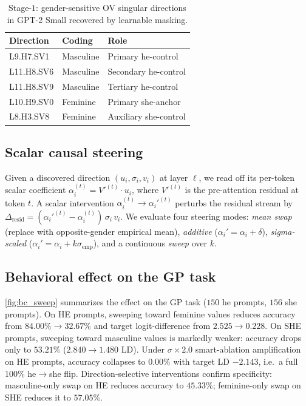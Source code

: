 \begin{table}[t]
\centering
\small
\caption{Stage-$1$: gender-sensitive OV singular directions in
GPT-2 Small recovered by learnable masking.}
\label{tab:directions}
\begin{tabular}{lll}
\toprule
Direction   & Coding    & Role             \\
\midrule
L9.H7.SV1   & Masculine & Primary he-control \\
L11.H8.SV6  & Masculine & Secondary he-control \\
L11.H8.SV9  & Masculine & Tertiary he-control \\
L10.H9.SV0  & Feminine  & Primary she-anchor \\
L8.H3.SV8   & Feminine  & Auxiliary she-control \\
\bottomrule
\end{tabular}
\end{table}

\subsection{Scalar causal steering}
\label{sec:bc_steering}

Given a discovered direction $(u_i, \sigma_i, v_i)$ at layer
$\ell$, we read off its per-token scalar coefficient
$\alpha_i^{(t)} = V'^{(t)} \cdot u_i$, where $V'^{(t)}$ is the
pre-attention residual at token $t$. A scalar intervention
$\alpha_i^{(t)} \to \alpha_i'^{(t)}$ perturbs the residual stream
by $\Delta_{\text{resid}} =
  (\alpha_i'^{(t)} - \alpha_i^{(t)})\,\sigma_i\,v_i$.
We evaluate four steering modes: \emph{mean swap} (replace with
opposite-gender empirical mean), \emph{additive}
($\alpha_i' = \alpha_i + \delta$), \emph{sigma-scaled}
($\alpha_i' = \alpha_i + k\sigma_{\text{emp}}$), and a continuous
\emph{sweep} over $k$.

\subsection{Behavioral effect on the GP task}
\label{sec:bc_gp}

\cref{fig:bc_sweep} summarizes the effect on the GP task
($150$ he prompts, $156$ she prompts). On HE prompts, sweeping
toward feminine values reduces accuracy from
$84.00\% \to 32.67\%$ and target logit-difference from
$2.525 \to 0.228$. On SHE prompts, sweeping toward masculine
values is markedly weaker: accuracy drops only to $53.21\%$
($2.840 \to 1.480$ LD). Under $\sigma\!\times\!2.0$ smart-ablation
amplification on HE prompts, accuracy collapses to $0.00\%$ with
target LD $-2.143$, i.e.\ a full $100\%$ he$\to$she flip.
Direction-selective interventions confirm specificity: masculine-only
swap on HE reduces accuracy to $45.33\%$; feminine-only swap on SHE
reduces it to $57.05\%$.

